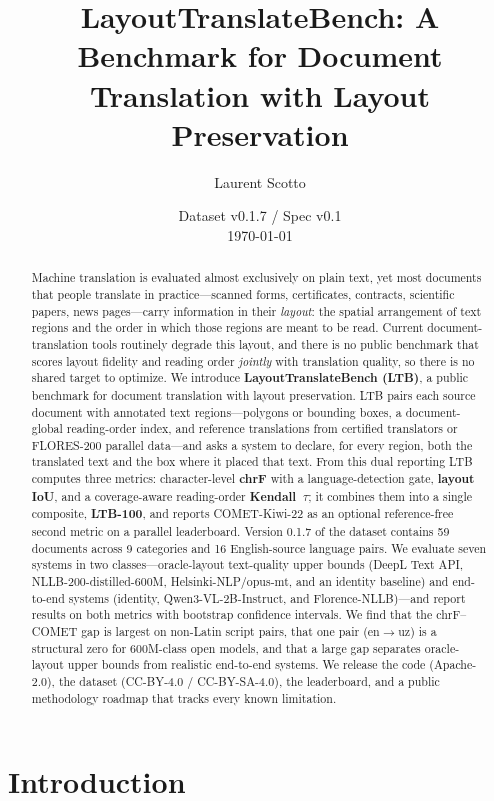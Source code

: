 \documentclass[11pt]{article}
\title{LayoutTranslateBench: A Benchmark for Document\\ Translation with Layout Preservation}
\author{Laurent Scotto}
\date{Dataset v0.1.7 \quad / \quad Spec v0.1 \\[2pt] \today}
\begin{document}
\maketitle

\begin{abstract}
Machine translation is evaluated almost exclusively on plain text, yet most
documents that people translate in practice---scanned forms, certificates,
contracts, scientific papers, news pages---carry information in their
\emph{layout}: the spatial arrangement of text regions and the order in which
those regions are meant to be read. Current document-translation tools
routinely degrade this layout, and there is no public benchmark that scores
layout fidelity and reading order \emph{jointly} with translation quality, so
there is no shared target to optimize. We introduce \textbf{LayoutTranslateBench
(LTB)}, a public benchmark for document translation with layout preservation.
LTB pairs each source document with annotated text regions---polygons or
bounding boxes, a document-global reading-order index, and reference
translations from certified translators or FLORES-200 parallel data---and asks
a system to declare, for every region, both the translated text and the box
where it placed that text. From this dual reporting LTB computes three metrics:
character-level \textbf{chrF} with a language-detection gate, \textbf{layout
IoU}, and a coverage-aware reading-order \textbf{Kendall~$\tau$}; it combines
them into a single composite, \textbf{LTB-100}, and reports COMET-Kiwi-22 as an
optional reference-free second metric on a parallel leaderboard. Version 0.1.7
of the dataset contains 59 documents across 9 categories and 16 English-source
language pairs. We evaluate seven systems in two classes---oracle-layout
text-quality upper bounds (DeepL Text API, NLLB-200-distilled-600M,
Helsinki-NLP/opus-mt, and an identity baseline) and end-to-end systems
(identity, Qwen3-VL-2B-Instruct, and Florence-NLLB)---and report results on both
metrics with bootstrap confidence intervals. We find that the chrF--COMET gap is
largest on non-Latin script pairs, that one pair (en$\rightarrow$uz) is a
structural zero for 600M-class open models, and that a large gap separates
oracle-layout upper bounds from realistic end-to-end systems. We release the
code (Apache-2.0), the dataset (CC-BY-4.0 / CC-BY-SA-4.0), the leaderboard, and
a public methodology roadmap that tracks every known limitation.
\end{abstract}

\section{Introduction}
\label{sec:intro}
\end{document}
